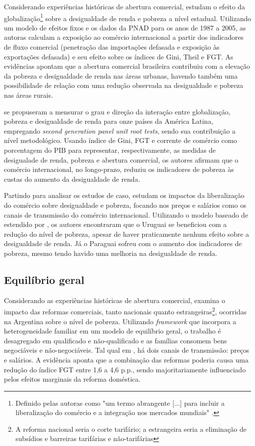Considerando experiências históricas de abertura comercial, \textcite{castilho12} estudam o efeito da globalização\footnote{Definido pelas autoras como "um termo abrangente [...] para incluir a liberalização do comércio e a integração nos mercados mundiais" \cite{castilho12}.} sobre a desigualdade de renda e pobreza a nível estadual. Utilizando um modelo de efeitos fixos e os dados da PNAD para os anos de 1987 a 2005, as autoras calculam a exposição ao comércio internacional a partir dos indicadores de fluxo comercial (penetração das importações defasada e exposição às exportações defasada) e seu efeito sobre os índices de Gini, Theil e FGT. As evidências apontam que a abertura comercial brasileira contribuiu com a elevação da pobreza e desigualdade de renda nas áreas
urbanas, havendo também uma possibilidade de relação com uma redução observada na desigualdade e pobreza nas áreas rurais.

\textcite{bayar17} se propuseram a mensurar o grau e direção da interação entre globalização, pobreza e desigualdade de renda para onze países da América Latina, empregando \textit{second generation panel unit root tests}, sendo sua contribuição a nível metodológico. Usando índice de Gini, FGT e corrente de comércio como porcentagem do PIB para representar, respectivamente, as medidas de desigualade de renda, pobreza e abertura comercial, os autores afirmam que o comércio internacional, no longo-prazo, reduziu os indicadores de pobreza às custas do aumento da desigualdade de renda.

Partindo para analisar os estudos de caso, \textcite{borrazetal12} estudam os impactos da liberalização do comércio sobre desigualdade e pobreza, focando nos preços e salários como os canais de transmissão do comércio internacional. Utilizando o modelo baseado de \textcite{dixit80} estendido por \textcite{porto06}, os autores encontraram que o Uruguai se beneficiou com a redução do nível de pobreza, apesar de haver praticamente nenhum efeito sobre a desigualdade de renda. Já o Paraguai sofreu com o aumento dos indicadores de pobreza, mesmo tendo havido uma melhoria na desigualdade de renda.

\subsection{Equilíbrio geral} \label{subsec:eq_geral}

Considerando as experiências históricas de abertura comercial, \textcite{porto03} examina o impacto das reformas comerciais, tanto nacionais quanto estrangeiras\footnote{A reforma nacional seria o corte tarifário; a estrangeira seria a eliminação de subsídios e barreiras tarifárias e não-tarifárias}, ocorridas na Argentina sobre o nível de pobreza. Utilizando \textit{framework} que incorpora a heterogeneidade familiar em um modelo de equilíbrio geral, o trabalho é desagregado em qualificado e não-qualificado e as famílias consomem bens negociáveis e não-negociáveis. Tal qual em \textcite{borrazetal12}, há dois canais de transmissão: preços e salários. A evidência aponta que a combinação das reformas poderia causa uma redução do índice FGT entre 1,6 a 4,6 p.p., sendo majoritariamente influenciado pelos efeitos marginais da reforma doméstica.

